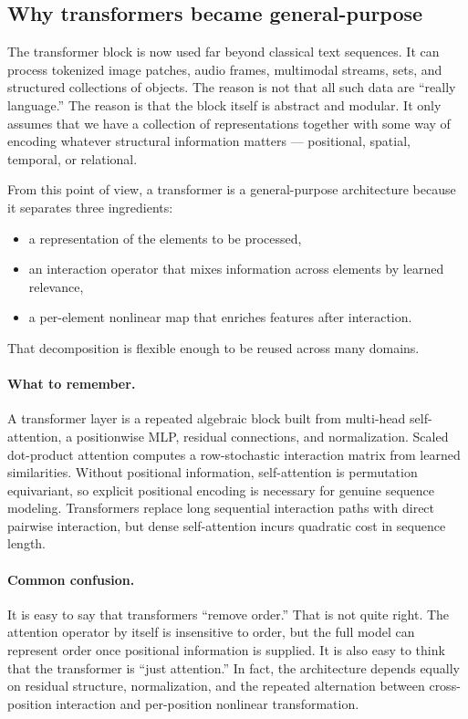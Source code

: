\subsection*{Why transformers became general-purpose}

The transformer block is now used far beyond classical text sequences.
It can process tokenized image patches, audio frames, multimodal streams, sets, and structured collections of objects.
The reason is not that all such data are ``really language.''
The reason is that the block itself is abstract and modular.
It only assumes that we have a collection of representations together with some way of encoding whatever structural information matters --- positional, spatial, temporal, or relational.

\medskip

From this point of view, a transformer is a general-purpose architecture because it separates three ingredients:
\begin{itemize}
    \item a representation of the elements to be processed,
    \item an interaction operator that mixes information across elements by learned relevance,
    \item a per-element nonlinear map that enriches features after interaction.
\end{itemize}
That decomposition is flexible enough to be reused across many domains.

\paragraph{What to remember.}
A transformer layer is a repeated algebraic block built from multi-head self-attention, a positionwise MLP, residual connections, and normalization.
Scaled dot-product attention computes a row-stochastic interaction matrix from learned similarities.
Without positional information, self-attention is permutation equivariant, so explicit positional encoding is necessary for genuine sequence modeling.
Transformers replace long sequential interaction paths with direct pairwise interaction, but dense self-attention incurs quadratic cost in sequence length.

\paragraph{Common confusion.}
It is easy to say that transformers ``remove order.''
That is not quite right.
The attention operator by itself is insensitive to order, but the full model can represent order once positional information is supplied.
It is also easy to think that the transformer is ``just attention.''
In fact, the architecture depends equally on residual structure, normalization, and the repeated alternation between cross-position interaction and per-position nonlinear transformation.

